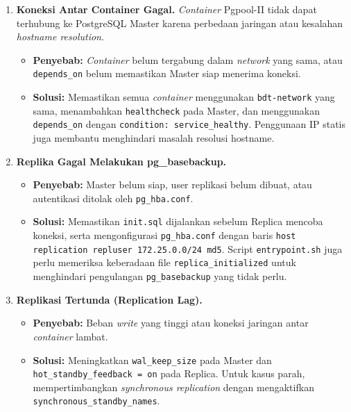 \begin{enumerate}
    \item \textbf{Koneksi Antar Container Gagal.} \textit{Container}
    Pgpool-II tidak dapat terhubung ke PostgreSQL Master karena
    perbedaan jaringan atau kesalahan \textit{hostname resolution}.
    \begin{itemize}
        \item \textbf{Penyebab:} \textit{Container} belum tergabung
        dalam \textit{network} yang sama, atau \texttt{depends\_on}
        belum memastikan Master siap menerima koneksi.
        \item \textbf{Solusi:} Memastikan semua \textit{container}
        menggunakan \texttt{bdt-network} yang sama, menambahkan
        \texttt{healthcheck} pada Master, dan menggunakan
        \texttt{depends\_on} dengan
        \texttt{condition: service\_healthy}. Penggunaan IP statis
        juga membantu menghindari masalah resolusi hostname.
    \end{itemize}

    \item \textbf{Replika Gagal Melakukan pg\_basebackup.}
    \begin{itemize}
        \item \textbf{Penyebab:} Master belum siap, user replikasi
        belum dibuat, atau autentikasi ditolak oleh
        \texttt{pg\_hba.conf}.
        \item \textbf{Solusi:} Memastikan \texttt{init.sql} dijalankan
        sebelum Replica mencoba koneksi, serta mengonfigurasi
        \texttt{pg\_hba.conf} dengan baris
        \texttt{host replication repluser 172.25.0.0/24 md5}. Script
        \texttt{entrypoint.sh} juga perlu memeriksa keberadaan file
        \texttt{replica\_initialized} untuk menghindari pengulangan
        \texttt{pg\_basebackup} yang tidak perlu.
    \end{itemize}

    \item \textbf{Replikasi Tertunda (Replication Lag).}
    \begin{itemize}
        \item \textbf{Penyebab:} Beban \textit{write} yang tinggi atau
        koneksi jaringan antar \textit{container} lambat.
        \item \textbf{Solusi:} Meningkatkan \texttt{wal\_keep\_size}
        pada Master dan \texttt{hot\_standby\_feedback = on} pada
        Replica. Untuk kasus parah, mempertimbangkan
        \textit{synchronous replication} dengan mengaktifkan
        \texttt{synchronous\_standby\_names}.
    \end{itemize}


\end{enumerate}
